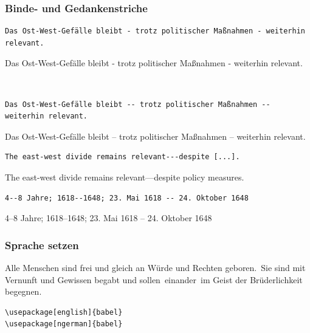 \documentclass[aspectratio=169, 10pt]{beamer}
\begin{document}
\begin{frame}[fragile]
    \frametitle{Binde- und Gedankenstriche}%
    \begin{wrong}
        \begin{lstlisting}
Das Ost-West-Gefälle bleibt - trotz politischer Maßnahmen - weiterhin relevant.
        \end{lstlisting}
        Das Ost-West-Gefälle bleibt - trotz politischer Maßnahmen - weiterhin relevant.
    \end{wrong}\\[2ex]\pause

    \begin{lstlisting}
Das Ost-West-Gefälle bleibt -- trotz politischer Maßnahmen -- weiterhin relevant.
    \end{lstlisting}
    Das Ost-West-Gefälle bleibt -- trotz politischer Maßnahmen -- weiterhin relevant.\\[2ex]\pause

    \begin{lstlisting}
The east-west divide remains relevant---despite [...].
    \end{lstlisting}
    The east-west divide remains relevant---despite policy measures.\\[2ex]
    \pause

    \begin{lstlisting}
4--8 Jahre; 1618--1648; 23. Mai 1618 -- 24. Oktober 1648
    \end{lstlisting}
    4--8 Jahre; 1618--1648; 23. Mai 1618 -- 24. Oktober 1648
\end{frame}

\begin{frame}[fragile]
    \frametitle{Sprache setzen}%
    \begin{justify}
        \Large
        Alle Menschen sind frei und gleich an Würde und Rechten ge\-boren.~Sie sind mit Vernunft und Gewissen begabt und sollen~ei\-nan\-der~im Geist der Brüderlichkeit begegnen.
    \end{justify}

    \begin{lstlisting}
\usepackage[english]{babel}
\usepackage[ngerman]{babel}
    \end{lstlisting}
\end{frame}
\end{document}
